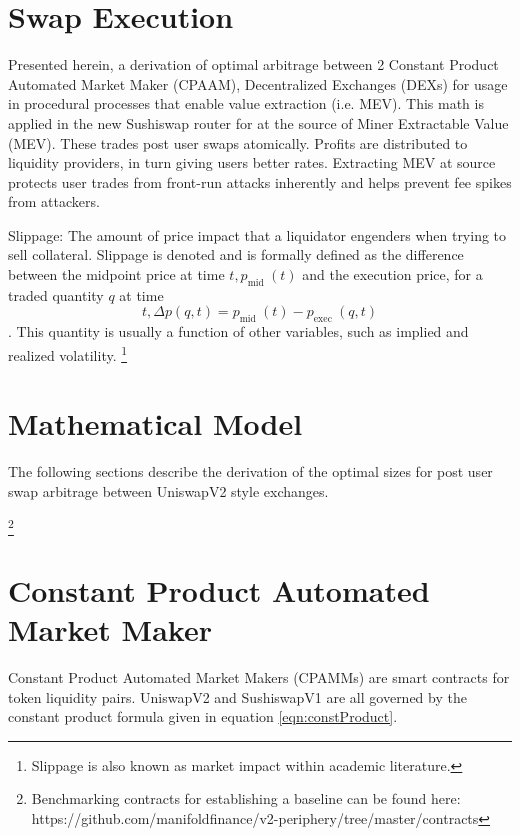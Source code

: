 \documentclass[runningheads]{llncs}
\begin{document}
\newpage
\section{Swap Execution}

Presented herein, a derivation of optimal arbitrage between 2 Constant Product Automated Market Maker (CPAAM), Decentralized Exchanges (DEXs) for usage in procedural processes that enable value extraction (i.e. MEV).
This math is applied in the new Sushiswap router for at the source of  Miner Extractable Value (MEV). These trades post user swaps atomically.
Profits are distributed to liquidity providers, in turn giving users better rates. Extracting MEV at source protects user trades from front-run attacks inherently and helps prevent fee spikes from attackers.
\newline 

Slippage: The amount of price impact that a liquidator engenders when trying to sell collateral.
Slippage is denoted  and is formally defined as the difference between the midpoint price at time $t, p_{\text {mid }}(t)$ and the execution price,   for a traded quantity $q$ at time $$t, \Delta p(q, t)=p_{\text {mid }}(t)-p_{\text {exec }}(q, t)$$. This quantity is usually a function of other variables, such as implied and realized volatility.
\footnote{Slippage is also known as market impact within academic literature.}


\newpage

\section{Mathematical Model}

The following sections describe the derivation of the optimal sizes for post user swap arbitrage between UniswapV2 style exchanges.

\footnote{Benchmarking contracts for establishing a baseline can be found here: https://github.com/manifoldfinance/v2-periphery/tree/master/contracts }




\section{Constant Product Automated Market Maker}
Constant Product Automated Market Makers (CPAMMs) are smart contracts for token liquidity pairs. UniswapV2 and SushiswapV1 are all governed by the constant product formula given in equation \ref{eqn:constProduct}.
\end{document}
